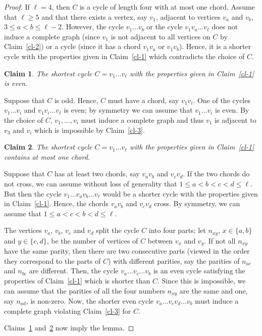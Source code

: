 \documentclass[10pt]{article}
\newtheorem{claim}{Claim}
\begin{document}
\begin{proof}
If $\ell=4$, then $C$ is a cycle of length four with at most one chord.
Assume that $\ell\ge 5$ and that there exists a vertex, say $v_1$, adjacent
to vertices $v_a$ and $v_b$, $3\le a<b\le\ell-2$.
However,
the cycle $v_1\ldots v_b$ or the cycle $v_1v_a\ldots v_{\ell}$ does not
induce a complete graph (since $v_1$ is not adjacent to all vertices on $C$ by Claim~\ref{cl-2})
or a cycle (since it has a chord $v_1v_a$ or $v_1v_b$). Hence, it is a shorter cycle
with the properties given in Claim~\ref{cl-1} which contradicts the choice of $C$.

\begin{claim}
\label{cl-3+}
The shortest cycle $C=v_1\ldots v_{\ell}$ with the properties given in Claim~\ref{cl-1} is even.
\end{claim}

Suppose that $C$ is odd. Hence, $C$ must have a chord, say $v_1v_i$.
One of the cycles $v_1\ldots v_i$ and $v_1v_i\ldots v_{\ell}$ is even;
by symmetry we can assume that $v_1\ldots v_i$ is even. By the choice
of $C$, $v_1,\ldots,v_i$ must induce a complete graph and thus $v_1$
is adjacent to $v_3$ and $v_i$ which is impossible by Claim~\ref{cl-3}.

\begin{claim}
\label{cl-4}
The shortest cycle $C=v_1\ldots v_{\ell}$ with the properties given in Claim~\ref{cl-1}
contains at most one chord.
\end{claim}
Suppose that $C$ has at least two chords, say $v_av_b$ and $v_cv_d$.
If the two chords do not cross, we can assume without loss of
generality that $1\le a<b<c<d\le\ell$. But then the cycle $v_1\ldots v_av_b\ldots v_{\ell}$
would be a shorter cycle with the properties given in Claim~\ref{cl-1}. 
Hence, the chords $v_av_b$ and $v_cv_d$ cross.
By symmetry, we can assume that $1\le a<c<b<d\le\ell$.

The vertices $v_a$, $v_b$, $v_c$ and $v_d$ split the cycle $C$ into four parts;
let $n_{xy}$, $x\in\{a,b\}$ and $y\in\{c,d\}$, be the number of vertices of $C$
between $v_x$ and $v_y$. If not all $n_{xy}$ have the same parity, then there are two
consecutive parts (viewed in the order they correspond to the parts of $C$) with different
parities, say the parities of $n_{ac}$ and $n_{bc}$ are different. Then,
the cycle $v_a\ldots v_c\ldots v_b$ is an even cycle satisfying the properties of Claim~\ref{cl-1}
which is shorter than $C$. Since this is impossible, we can assume that the parities of
all the four numbers $n_{xy}$ are the same and one, say $n_{ad}$, is non-zero.
Now, the shorter even cycle $v_a\ldots v_cv_d\ldots v_b$ must induce a complete
graph violating Claim~\ref{cl-3} for $C$.

\smallskip

Claims~\ref{cl-3+} and~\ref{cl-4} now imply the lemma.
\end{proof}
\end{document}
